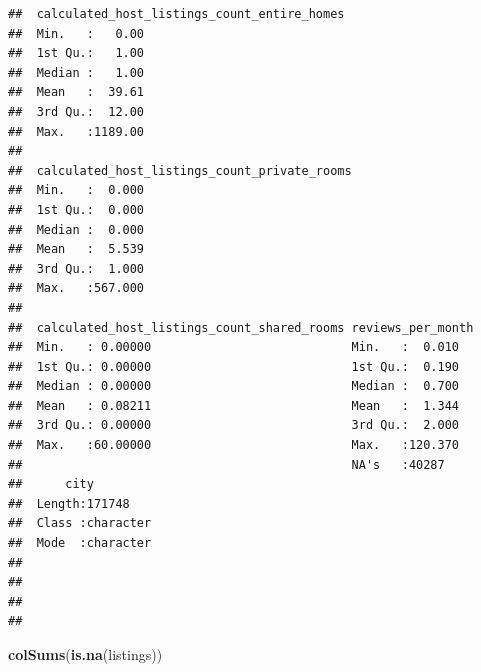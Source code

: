 \documentclass[
]{article}
\newenvironment{Shaded}{\begin{snugshade}}{\end{snugshade}}
\newcommand{\FunctionTok}[1]{\textcolor[rgb]{0.13,0.29,0.53}{\textbf{#1}}}
\newcommand{\NormalTok}[1]{#1}
\begin{document}
\begin{verbatim}
##  calculated_host_listings_count_entire_homes
##  Min.   :   0.00                            
##  1st Qu.:   1.00                            
##  Median :   1.00                            
##  Mean   :  39.61                            
##  3rd Qu.:  12.00                            
##  Max.   :1189.00                            
##                                             
##  calculated_host_listings_count_private_rooms
##  Min.   :  0.000                             
##  1st Qu.:  0.000                             
##  Median :  0.000                             
##  Mean   :  5.539                             
##  3rd Qu.:  1.000                             
##  Max.   :567.000                             
##                                              
##  calculated_host_listings_count_shared_rooms reviews_per_month
##  Min.   : 0.00000                            Min.   :  0.010  
##  1st Qu.: 0.00000                            1st Qu.:  0.190  
##  Median : 0.00000                            Median :  0.700  
##  Mean   : 0.08211                            Mean   :  1.344  
##  3rd Qu.: 0.00000                            3rd Qu.:  2.000  
##  Max.   :60.00000                            Max.   :120.370  
##                                              NA's   :40287    
##      city          
##  Length:171748     
##  Class :character  
##  Mode  :character  
##                    
##                    
##                    
## 
\end{verbatim}

\begin{Shaded}
\begin{Highlighting}[]
\FunctionTok{colSums}\NormalTok{(}\FunctionTok{is.na}\NormalTok{(listings))}
\end{Highlighting}
\end{Shaded}
\end{document}
